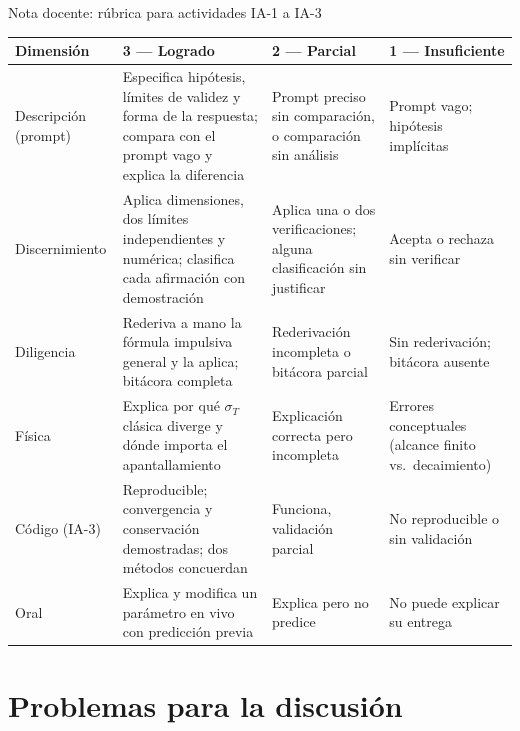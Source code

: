 \documentclass[aspectratio=169]{beamer}
\begin{document}
\begin{frame}{Nota docente: rúbrica para actividades IA-1 a IA-3}
\scriptsize
\begin{tabular}{p{2.0cm}p{3.9cm}p{3.9cm}p{3.9cm}}
\toprule
Dimensión & 3 --- Logrado & 2 --- Parcial & 1 --- Insuficiente\\
\midrule
Descripción (prompt) & Especifica hipótesis, límites de validez y forma de la respuesta; compara con el prompt vago y explica la diferencia & Prompt preciso sin comparación, o comparación sin análisis & Prompt vago; hipótesis implícitas\\
Discernimiento & Aplica dimensiones, dos límites independientes y numérica; clasifica cada afirmación con demostración & Aplica una o dos verificaciones; alguna clasificación sin justificar & Acepta o rechaza sin verificar\\
Diligencia & Rederiva a mano la fórmula impulsiva general y la aplica; bitácora completa & Rederivación incompleta o bitácora parcial & Sin rederivación; bitácora ausente\\
Física & Explica por qué $\sigma_T$ clásica diverge y dónde importa el apantallamiento & Explicación correcta pero incompleta & Errores conceptuales (alcance finito vs.\ decaimiento)\\
Código (IA-3) & Reproducible; convergencia y conservación demostradas; dos métodos concuerdan & Funciona, validación parcial & No reproducible o sin validación\\
Oral & Explica y modifica un parámetro en vivo con predicción previa & Explica pero no predice & No puede explicar su entrega\\
\bottomrule
\end{tabular}
\end{frame}
\fi

\section[Problemas]{Problemas para la discusión}
\end{document}
